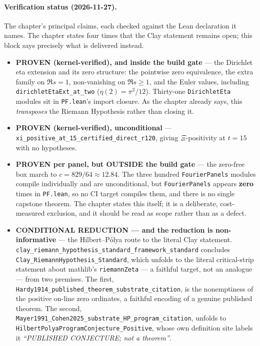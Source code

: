 \paragraph{Verification status (2026-11-27).}
The chapter's principal claims, each checked against the Lean declaration it
names. The chapter states four times that the Clay statement remains open; this
block says precisely what is delivered instead.
\begin{itemize}

\item \textbf{PROVEN (kernel-verified), and inside the build gate} --- the
Dirichlet eta extension and its zero structure: the pointwise zero
equivalence, the extra family on $\Re s = 1$, non-vanishing on
$\Re s \ge 1$, and the Euler values, including
\texttt{dirichletEtaExt\_at\_two} ($\eta(2) = \pi^2/12$). Thirty-one
\texttt{DirichletEta} modules sit in \texttt{PF.lean}'s import closure. As the
chapter already says, this \emph{transposes} the Riemann Hypothesis rather
than closing it.

\item \textbf{PROVEN (kernel-verified), unconditional} ---
\texttt{xi\_positive\_at\_15\_certified\_direct\_r120}, giving
$\Xi$-positivity at $t = 15$ with no hypotheses.

\item \textbf{PROVEN per panel, but OUTSIDE the build gate} --- the zero-free
box march to $c = 829/64 \approx 12.84$. The three hundred
\texttt{FourierPanels} modules compile individually and are unconditional, but
\texttt{FourierPanels} appears \textbf{zero} times in \texttt{PF.lean}, so no
CI target compiles them, and there is no single capstone theorem. The chapter
states this itself; it is a deliberate, cost-measured exclusion, and it should
be read as scope rather than as a defect.

\item \textbf{CONDITIONAL REDUCTION --- and the reduction is
non-informative} --- the Hilbert--P\'olya route to the literal Clay statement.
\texttt{clay\_riemann\_hypothesis\_standard\_framework\_standard} concludes
\texttt{Clay\_RiemannHypothesis\_Standard}, which unfolds to the literal
critical-strip statement about mathlib's \texttt{riemannZeta} --- a faithful
target, not an analogue --- from two premises. The first,
\texttt{Hardy1914\_published\_theorem\_substrate\_citation}, is the
nonemptiness of the positive on-line zero ordinates, a faithful encoding of a
genuine published theorem. The second,
\texttt{Mayer1991\_Cohen2025\_substrate\_HP\_program\_citation}, unfolds to
\texttt{HilbertPolyaProgramConjecture\_Positive}, whose own definition site
labels it \emph{``PUBLISHED CONJECTURE; not a theorem''}.


\end{itemize}
